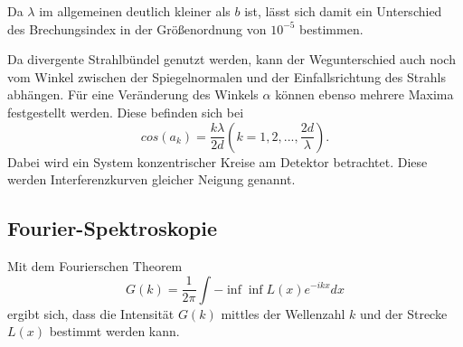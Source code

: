 Da $\lambda$ im allgemeinen deutlich kleiner als $b$ ist, lässt sich damit ein Unterschied des Brechungsindex in der Größenordnung von $10^{-5}$ bestimmen. 

Da divergente Strahlbündel genutzt werden, kann der Wegunterschied auch noch vom Winkel zwischen der Spiegelnormalen und der Einfallsrichtung des Strahls abhängen. Für eine Veränderung des Winkels $\alpha$ können ebenso mehrere Maxima festgestellt werden. Diese befinden sich bei 
\begin{equation}
    cos (a_k)= \frac{k \lambda}{2 d} (k= 1, 2, ..., \frac{2d}{\lambda}).
\end{equation}
Dabei wird ein System konzentrischer Kreise am Detektor betrachtet. Diese werden Interferenzkurven gleicher Neigung genannt. 

\subsection{Fourier-Spektroskopie}

Mit dem Fourierschen Theorem 
\begin{equation}
    G(k)= \frac{1}{2\pi} \int{-\inf}{\inf} L(x) e^{-i k x} dx
    \label{eqn:fourier}
\end{equation}
ergibt sich, dass die Intensität $G(k)$ mittles der Wellenzahl $k$ und der Strecke $L(x)$ bestimmt werden kann.
